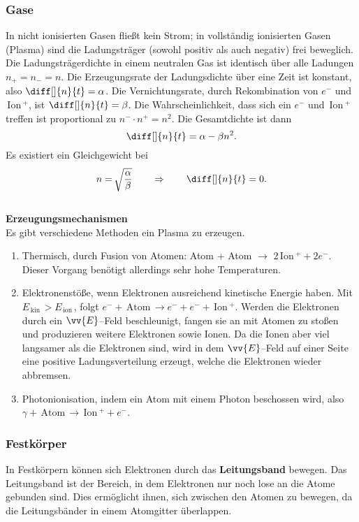 \documentclass[a4paper,12pt]{article}
\begin{document}
\subsubsection{Gase}
In nicht ionisierten Gasen fließt kein Strom; in vollständig ionisierten Gasen (Plasma) sind die Ladungsträger (sowohl positiv als auch negativ) frei beweglich. Die Ladungsträgerdichte in einem neutralen Gas ist identisch über alle Ladungen $n_+=n_-=n$. Die Erzeugungsrate der Ladungsdichte über eine Zeit ist konstant, also $\diff[]{n}{t}=\alpha $. Die Vernichtungsrate, durch Rekombination von $e^-$ und $\,\text{Ion}\,^+$, ist $\diff[]{n}{t}=\beta $. Die Wahrscheinlichkeit, dass sich ein $e^-$ und $\,\text{Ion}\,^+$ treffen ist proportional zu $n^-\cdot n^+=n^2$. Die Gesamtdichte ist dann
\[ 
        \diff[]{n}{t}=\alpha -\beta n^2
.\] 
Es existiert ein Gleichgewicht bei
\[ 
        n=\,\sqrt[]{\dfrac{\alpha }{\beta }}\qquad \Rightarrow \qquad \diff[]{n}{t}=0
.\] 
\hfill\\\textbf{Erzeugungsmechanismen}\\ 
Es gibt verschiedene Methoden ein Plasma zu erzeugen.
\begin{enumerate}[label=\arabic*.]
        \item Thermisch, durch Fusion von Atomen: Atom + Atom $\rightarrow $ $2\,\text{Ion}\,^++2e^-$. Dieser Vorgang benötigt allerdings sehr hohe Temperaturen.
        \item Elektronenstöße, wenn Elektronen ausreichend kinetische Energie haben. Mit $E_{\,\text{kin}\,}>E_{\,\text{ion}\,}$, folgt $e^-+\,\text{Atom}\,\rightarrow e^-+e^-+\,\text{Ion}\,^+$. Werden die Elektronen durch ein $\vv{E}$--Feld beschleunigt, fangen sie an mit Atomen zu stoßen und produzieren weitere Elektronen sowie Ionen. Da die Ionen aber viel langsamer als die Elektronen sind, wird in dem $\vv{E}$--Feld auf einer Seite eine positive Ladungsverteilung erzeugt, welche die Elektronen wieder abbremsen.
        \item Photonionisation, indem ein Atom mit einem Photon beschossen wird, also $\gamma +\,\text{Atom}\,\rightarrow \,\text{Ion}\,^++e^-$.
\end{enumerate}

\subsubsection{Festkörper}
In Festkörpern können sich Elektronen durch das \textbf{Leitungsband} bewegen. Das Leitungsband ist der Bereich, in dem Elektronen nur noch lose an die Atome gebunden sind. Dies ermöglicht ihnen, sich zwischen den Atomen zu bewegen, da die Leitungsbänder in einem Atomgitter überlappen. 
\end{document}
